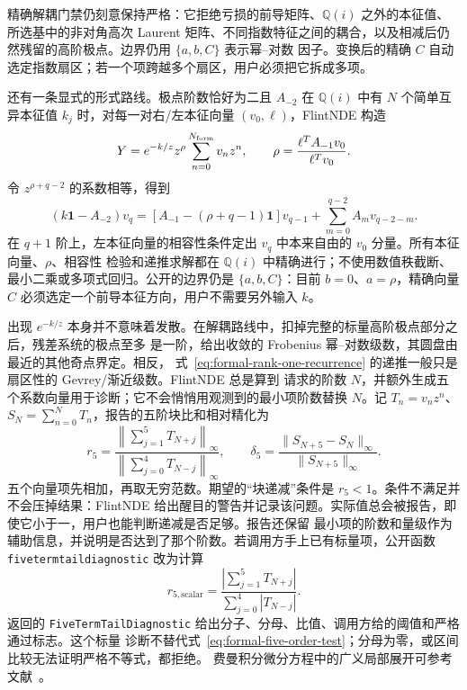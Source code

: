\documentclass[11pt,a4paper]{ctexart}
\newcommand{\Id}{\mathbf 1}
\renewcommand{\_}{\origunderscore\allowbreak}
\begin{document}
精确解耦门禁仍刻意保持严格：它拒绝亏损的前导矩阵、$\mathbb Q(i)$ 之外的本征值、所选基中的非对角高次
Laurent 矩阵、不同指数特征之间的耦合，以及相减后仍然残留的高阶极点。边界仍用 $\{a,b,C\}$ 表示幂--对数
因子。变换后的精确 $C$ 自动选定指数扇区；若一个项跨越多个扇区，用户必须把它拆成多项。

还有一条显式的形式路线。极点阶数恰好为二且 $A_{-2}$ 在 $\mathbb Q(i)$ 中有 $N$ 个简单互异本征值
$k_j$ 时，对每一对右/左本征向量 $(v_0,\ell)$，FlintNDE 构造
\begin{equation}
 Y=e^{-k/z}z^\rho\sum_{n=0}^{N_{\rm form}}v_nz^n,
 \qquad
 \rho=\frac{\ell^T A_{-1}v_0}{\ell^Tv_0}.
 \label{eq:formal-rank-one-ansatz}
\end{equation}
令 $z^{\rho+q-2}$ 的系数相等，得到
\begin{equation}
 (k\Id-A_{-2})v_q=
 \left[A_{-1}-(\rho+q-1)\Id\right]v_{q-1}
 +\sum_{m=0}^{q-2}A_m v_{q-2-m}.
 \label{eq:formal-rank-one-recurrence}
\end{equation}
在 $q+1$ 阶上，左本征向量的相容性条件定出 $v_q$ 中本来自由的 $v_0$ 分量。所有本征向量、$\rho$、相容性
检验和递推求解都在 $\mathbb Q(i)$ 中精确进行；不使用数值秩截断、最小二乘或多项式回归。公开的边界仍是
$\{a,b,C\}$：目前 $b=0$、$a=\rho$，精确向量 $C$ 必须选定一个前导本征方向，用户不需要另外输入 $k$。

出现 $e^{-k/z}$ 本身并不意味着发散。在解耦路线中，扣掉完整的标量高阶极点部分之后，残差系统的极点至多
是一阶，给出收敛的 Frobenius 幂--对数级数，其圆盘由最近的其他奇点界定。相反，
式~\eqref{eq:formal-rank-one-recurrence} 的递推一般只是扇区性的 Gevrey/渐近级数。FlintNDE 总是算到
请求的阶数 $N$，并额外生成五个系数向量用于诊断；它不会悄悄用观测到的最小项阶数替换 $N$。记
$T_n=v_nz^n$、$S_N=\sum_{n=0}^{N}T_n$，报告的五阶块比和相对精化为
\begin{equation}
 r_5=\frac{\left\|\sum_{j=1}^{5}T_{N+j}\right\|_\infty}
 {\left\|\sum_{j=0}^{4}T_{N-j}\right\|_\infty},
 \qquad
 \delta_5=\frac{\|S_{N+5}-S_N\|_\infty}{\|S_{N+5}\|_\infty}.
 \label{eq:formal-five-order-test}
\end{equation}
五个向量项先相加，再取无穷范数。期望的“块递减”条件是 $r_5<1$。条件不满足并不会压掉结果：FlintNDE
给出醒目的警告并记录该问题。实际值总会被报告，即使它小于一，用户也能判断递减是否足够。报告还保留
最小项的阶数和量级作为辅助信息，并说明是否达到了那个阶数。若调用方手上已有标量项，公开函数
\texttt{five\_term\_tail\_diagnostic} 改为计算
\begin{equation}
 r_{5,\mathrm{scalar}}=
 \frac{\left|\sum_{j=1}^{5}T_{N+j}\right|}
 {\sum_{j=0}^{4}\left|T_{N-j}\right|}.
 \label{eq:public-scalar-five-order-test}
\end{equation}
返回的 \texttt{FiveTermTailDiagnostic} 给出分子、分母、比值、调用方给的阈值和严格通过标志。这个标量
诊断不替代式~\eqref{eq:formal-five-order-test}；分母为零，或区间比较无法证明严格不等式，都拒绝。
费曼积分微分方程中的广义局部展开可参考文献~\cite{Moriello:2019yhu}。
\end{document}
